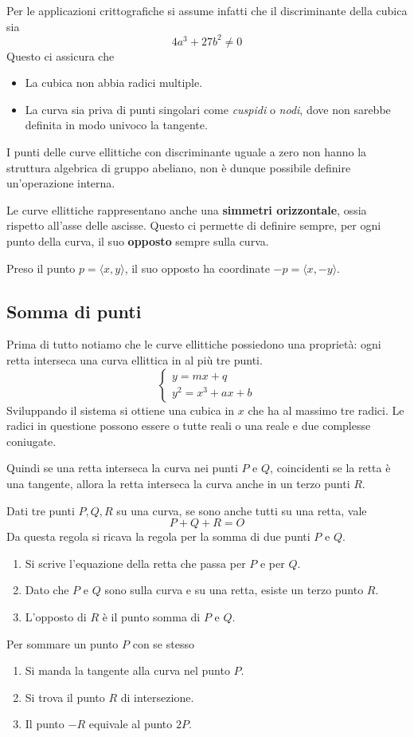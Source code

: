 Per le applicazioni crittografiche si assume infatti che il discriminante della cubica sia
\[ 4 a^3 + 27 b^2 \neq 0 \]
Questo ci assicura che
\begin{itemize}
	\item La cubica non abbia radici multiple.
	\item La curva sia priva di punti singolari come \emph{cuspidi} o \emph{nodi}, dove non sarebbe definita in
	      modo univoco la tangente.
\end{itemize}
I punti delle curve ellittiche con discriminante uguale a zero non hanno la struttura algebrica di gruppo abeliano,
non \`e dunque possibile definire un'operazione interna.

Le curve ellittiche rappresentano anche una \textbf{simmetri orizzontale}, ossia rispetto all'asse delle ascisse.
Questo ci permette di definire sempre, per ogni punto della curva, il suo \textbf{opposto} sempre sulla curva.

Preso il punto $p = \langle x, y \rangle$, il suo opposto ha coordinate $-p = \langle x, -y \rangle$.

\subsection{Somma di punti}
Prima di tutto notiamo che le curve ellittiche possiedono una propriet\`a: ogni retta interseca una curva ellittica
in al pi\`u tre punti.
\[
	\begin{cases}
		y = mx + q \\
		y^2 = x^3 + ax + b
	\end{cases}
\]
Sviluppando il sistema si ottiene una cubica in $x$ che ha al massimo tre radici. Le radici in questione possono
essere o tutte reali o una reale e due complesse coniugate.

Quindi se una retta interseca la curva nei punti $P$ e $Q$, coincidenti se la retta \`e una tangente, allora la
retta interseca la curva anche in un terzo punti $R$.

Dati tre punti $P, Q, R$ su una curva, se sono anche tutti su una retta, vale
\[ P + Q + R = O \]
Da questa regola si ricava la regola per la somma di due punti $P$ e $Q$.
\begin{enumerate}
	\item Si scrive l'equazione della retta che passa per $P$ e per $Q$.
	\item Dato che $P$ e $Q$ sono sulla curva e su una retta, esiste un terzo punto $R$.
	\item L'opposto di $R$ \`e il punto somma di $P$ e $Q$.
\end{enumerate}
Per sommare un punto $P$ con se stesso
\begin{enumerate}
	\item Si manda la tangente alla curva nel punto $P$.
	\item Si trova il punto $R$ di intersezione.
	\item Il punto $-R$ equivale al punto $2P$.
\end{enumerate}
